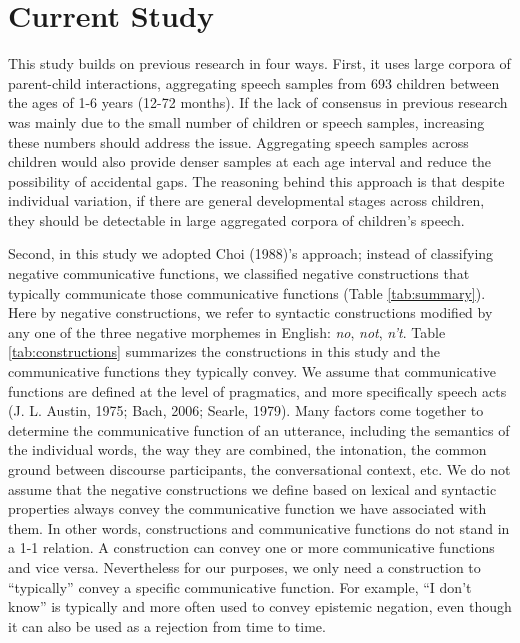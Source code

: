 \documentclass[
  man,floatsintext]{apa6}
\begin{document}
\section{Current Study}\label{current-study}

This study builds on previous research in four ways. First, it uses large corpora of parent-child interactions, aggregating speech samples from 693 children between the ages of 1-6 years (12-72 months). If the lack of consensus in previous research was mainly due to the small number of children or speech samples, increasing these numbers should address the issue. Aggregating speech samples across children would also provide denser samples at each age interval and reduce the possibility of accidental gaps. The reasoning behind this approach is that despite individual variation, if there are general developmental stages across children, they should be detectable in large aggregated corpora of children's speech.

Second, in this study we adopted Choi (1988)'s approach; instead of classifying negative communicative functions, we classified negative constructions that typically communicate those communicative functions (Table \ref{tab:summary}). Here by negative constructions, we refer to syntactic constructions modified by any one of the three negative morphemes in English: \emph{no}, \emph{not}, \emph{n't}. Table \ref{tab:constructions} summarizes the constructions in this study and the communicative functions they typically convey. We assume that communicative functions are defined at the level of pragmatics, and more specifically speech acts (J. L. Austin, 1975; Bach, 2006; Searle, 1979). Many factors come together to determine the communicative function of an utterance, including the semantics of the individual words, the way they are combined, the intonation, the common ground between discourse participants, the conversational context, etc. We do not assume that the negative constructions we define based on lexical and syntactic properties always convey the communicative function we have associated with them. In other words, constructions and communicative functions do not stand in a 1-1 relation. A construction can convey one or more communicative functions and vice versa. Nevertheless for our purposes, we only need a construction to ``typically'' convey a specific communicative function. For example, ``I don't know'' is typically and more often used to convey epistemic negation, even though it can also be used as a rejection from time to time.
\end{document}
